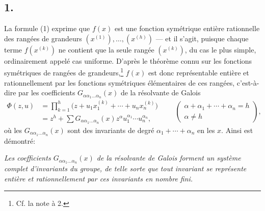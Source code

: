 \subsection*{1.}
La formule (1) exprime que $f(x)$ est une fonction symétrique entière rationnelle des rangées de grandeurs $(x^{(1)}),\ldots,(x^{(h)})$ --- et il s'agit, puisque chaque terme $f(x^{(k)})$ ne contient que la seule rangée $(x^{(k)})$, du cas le plus simple, ordinairement appelé cas uniforme. D'après le théorème connu sur les fonctions symétriques de rangées de grandeurs,\footnote{Cf. la note à 2.} $f(x)$ est donc représentable entière et rationnellement par les fonctions symétriques élémentaires de ces rangées, c'est-à-dire par les coefficients $G_{\alpha\alpha_1\ldots\alpha_n}(x)$ de la \og{} résolvante de Galois \fg{}
\[
\begin{aligned}
  \Phi(z,u)
  &=\prod_{k=1}^{h}\bigl(z+u_1x_1^{(k)}+\cdots+u_nx_n^{(k)}\bigr) \\
  &=z^h+
    \sum G_{\alpha\alpha_1\ldots\alpha_n}(x)
    z^{\alpha}u_1^{\alpha_1}\cdots u_n^{\alpha_n},
\end{aligned}
\qquad
\left(\begin{array}{c}
\alpha+\alpha_1+
\cdots+
\alpha_n=h\\
\alpha\ne h
\end{array}\right),
\]
où les $G_{\alpha\alpha_1\ldots\alpha_n}(x)$ sont des invariants de degré $\alpha_1+\cdots+\alpha_n$ en les $x$. Ainsi est démontré:

\emph{Les coefficients $G_{\alpha\alpha_1\ldots\alpha_n}(x)$ de la résolvante de Galois forment un système complet d'invariants du groupe, de telle sorte que tout invariant se représente entière et rationnellement par ces invariants en nombre fini.}

